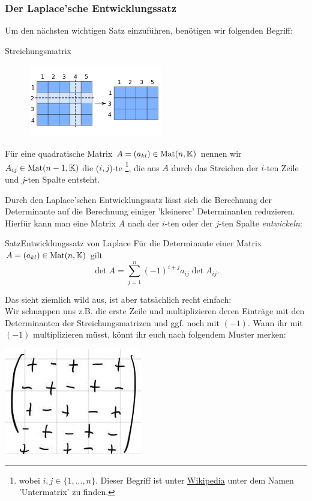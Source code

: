 \subsubsection{Der Laplace'sche Entwicklungssatz}
Um den nächsten wichtigen Satz einzuführen, benötigen wir folgenden Begriff:
\begin{Def}
{Streichungsmatrix}
\begin{figure}
 \vspace{-30pt}
\includegraphics[width=.35\textwidth]{Dateien/01/01Submatrix_qtl1.svg.png}
 \vspace{-15pt}
\end{figure}
Für eine quadratische Matrix $A=(a_{kl})\in\text{Mat}(n,\mathbb{K})$ nennen wir $A_{ij}\in\text{Mat}(n-1,\mathbb{K})$ die ($i,j$)-te \footnote{wobei $i,j\in\{1,...,n\}$. Dieser Begriff ist unter \href{https://de.wikipedia.org/wiki/Untermatrix}{Wikipedia} unter dem Namen 'Untermatrix' zu finden.}, die aus $A$ durch das Streichen der $i$-ten Zeile und $j$-ten Spalte entsteht.
\end{Def}
Durch den Laplace'schen Entwicklungssatz lässt sich die Berechnung der Determinante auf die Berechnung einiger 'kleinerer' Determinanten reduzieren.\\
Hierfür kann man eine Matrix $A$ nach der $i$-ten oder der $j$-ten Spalte \textit{entwickeln}:
\begin{Satz}{Satz}{Entwicklungssatz von Laplace}
Für die Determinante einer Matrix $A=(a_{kl})\in\text{Mat}(n,\mathbb{K})$ gilt
\begin{equation}
    \det A=\sum_{j=1}^n(-1)^{i+j}a_{ij}\det A_{ij}.
\end{equation}
\end{Satz}
Das sieht ziemlich wild aus, ist aber tatsächlich recht einfach:\\
Wir schnappen uns z.B. die erste Zeile und multiplizieren deren Einträge mit den Determinanten der Streichungsmatrizen und ggf. noch mit $(-1)$.
Wann ihr mit $(-1)$ multiplizieren müsst, könnt ihr euch nach folgendem Muster merken:
\begin{center}
    \includegraphics[width=.15\textwidth]{Dateien/01/01Laplacschema.jpg}
\end{center}
